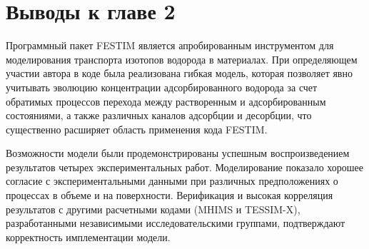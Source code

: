 \section{Выводы к главе 2}

Программный пакет FESTIM является апробированным инструментом для моделирования транспорта изотопов водорода в материалах. При определяющем участии автора в коде была реализована гибкая модель, которая позволяет явно учитывать эволюцию концентрации адсорбированного водорода за счет обратимых процессов перехода между растворенным и адсорбированным состояниями, а также различных каналов адсорбции и десорбции, что существенно расширяет область применения кода FESTIM.

Возможности модели были продемонстрированы успешным воспроизведением результатов четырех экспериментальных работ. Моделирование показало хорошее согласие с экспериментальными данными при различных предположениях о процессах в объеме и на поверхности. Верификация и высокая корреляция результатов с другими расчетными кодами (MHIMS и TESSIM-X), разработанными независимыми исследовательскими группами, подтверждают корректность имплементации модели.




